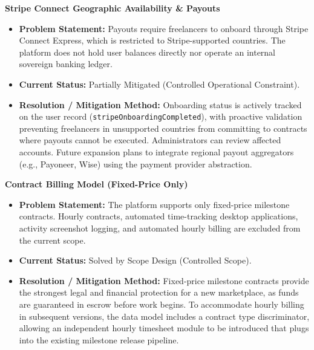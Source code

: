 \begin{description}[leftmargin=2.0cm,labelwidth=1.8cm,align=left,font=\normalfont\bfseries]
\item[LI-02] \textbf{Stripe Connect Geographic Availability \& Payouts}
\begin{itemize}[leftmargin=0.5cm, label=--]
\item \textbf{Problem Statement:} Payouts require freelancers to onboard through Stripe Connect Express, which is restricted to Stripe-supported countries. The platform does not hold user balances directly nor operate an internal sovereign banking ledger.
\item \textbf{Current Status:} Partially Mitigated (Controlled Operational Constraint).
\item \textbf{Resolution / Mitigation Method:} Onboarding status is actively tracked on the user record (\texttt{stripeOnboardingCompleted}), with proactive validation preventing freelancers in unsupported countries from committing to contracts where payouts cannot be executed. Administrators can review affected accounts. Future expansion plans to integrate regional payout aggregators (e.g., Payoneer, Wise) using the payment provider abstraction.
\end{itemize}

\item[LI-03] \textbf{Contract Billing Model (Fixed-Price Only)}
\begin{itemize}[leftmargin=0.5cm, label=--]
\item \textbf{Problem Statement:} The platform supports only fixed-price milestone contracts. Hourly contracts, automated time-tracking desktop applications, activity screenshot logging, and automated hourly billing are excluded from the current scope.
\item \textbf{Current Status:} Solved by Scope Design (Controlled Scope).
\item \textbf{Resolution / Mitigation Method:} Fixed-price milestone contracts provide the strongest legal and financial protection for a new marketplace, as funds are guaranteed in escrow before work begins. To accommodate hourly billing in subsequent versions, the data model includes a contract type discriminator, allowing an independent hourly timesheet module to be introduced that plugs into the existing milestone release pipeline.
\end{itemize}


\end{description}
